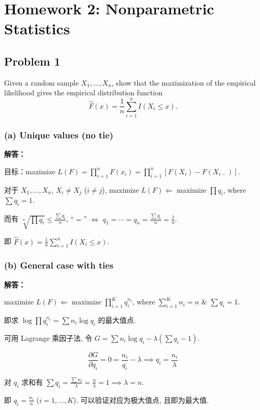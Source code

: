 \section{Homework 2: Nonparametric Statistics}

\subsection{Problem 1}

Given a random sample $X_1, \ldots, X_n$, show that the maximization of the empirical likelihood gives the empirical distribution function
\[
\hat{F}(x) = \frac{1}{n} \sum_{i=1}^{n} I(X_i \leq x).
\]

\subsubsection*{(a) Unique values (no tie)}

\textbf{解答：}

目标：maximize $L(F) = \prod_{i=1}^{n} F(x_i) = \prod_{i=1}^{n} [F(X_i) - F(X_{i-})]$.

对于 $X_1, \ldots, X_n$, $X_i \neq X_j$ ($i \neq j$), maximize $L(F) \Leftarrow$ maximize $\prod q_i$, where $\sum q_i = 1$.

而有 $\sqrt[n]{\prod q_i} \leq \frac{\sum q_i}{n}$, ``$=$'' $\Leftrightarrow$ $q_1 = \cdots = q_n = \frac{\sum q_i}{n} = \frac{1}{n}$.

即 $\hat{F}(x) = \frac{1}{n} \sum_{i=1}^{n} I(X_i \leq x)$.

\subsubsection*{(b) General case with ties}

\textbf{解答：}

maximize $L(F) \Leftarrow$ maximize $\prod_{i=1}^{K} q_i^{n_i}$, where $\sum_{i=1}^{K} n_i = n$ \& $\sum q_i = 1$.

即求 $\log \prod q_i^{n_i} = \sum n_i \log q_i$ 的最大值点.

可用 Lagrange 乘因子法, 令 $G = \sum n_i \log q_i - \lambda (\sum q_i - 1)$.

\[
\frac{\partial G}{\partial q_i} = 0 = \frac{n_i}{q_i} - \lambda \implies q_i = \frac{n_i}{\lambda}
\]

对 $q_i$ 求和有 $\sum q_i = \frac{\sum n_i}{\lambda} = \frac{n}{\lambda} = 1 \implies \lambda = n$.

即 $q_i = \frac{n_i}{n}$ ($i = 1, \ldots, K$). 可以验证对应为极大值点, 且即为最大值.

